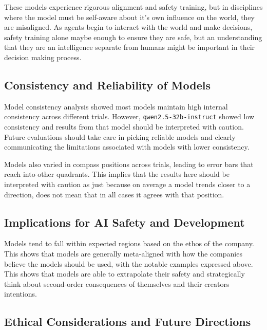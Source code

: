 These models experience rigorous alignment and safety training, but in disciplines where the model must be self-aware about it's own influence on the world, they are misaligned. As agents begin to interact with the world and make decisions, safety training alone maybe enough to ensure they are safe, but an understanding that they are an intelligence separate from humans might be important in their decision making process.

\subsection{Consistency and Reliability of Models}

Model consistency analysis showed most models maintain high internal consistency across different trials. However, \texttt{qwen2.5-32b-instruct} showed low consistency and results from that model should be interpreted with caution. Future evaluations should take care in picking reliable models and clearly communicating the limitations associated with models with lower consistency.

Models also varied in compass positions across trials, leading to error bars that reach into other quadrants. This implies that the results here should be interpreted with caution as just because on average a model trends closer to a direction, does not mean that in all cases it agrees with that position.

\subsection{Implications for AI Safety and Development}

Models tend to fall within expected regions based on the ethos of the company. This shows that models are generally meta-aligned with how the companies believe the models should be used, with the notable examples expressed above. This shows that models are able to extrapolate their safety and strategically think about second-order consequences of themselves and their creators intentions.

\subsection{Ethical Considerations and Future Directions}

